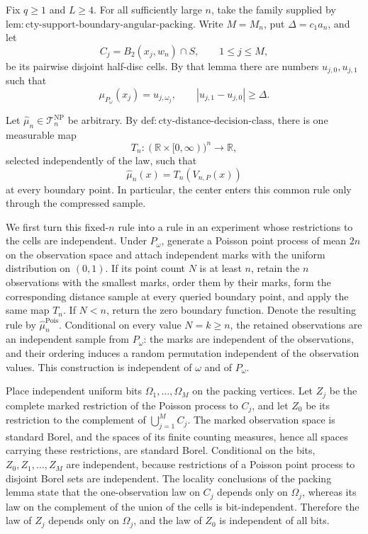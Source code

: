 Fix \(q\geq1\) and \(L\geq4\).  For all sufficiently large \(n\), take the family supplied by \(\mathrm{lem:cty\text{-}support\text{-}boundary\text{-}angular\text{-}packing}\).  Write \(M=M_n\), put \(\Delta=c_1a_n\), and let
\[
 C_j=B_2(x_j,w_n)\cap S,\qquad 1\leq j\leq M,
\]
be its pairwise disjoint half-disc cells.  By that lemma there are numbers \(u_{j,0},u_{j,1}\) such that
\[
 \mu_{P_\omega}(x_j)=u_{j,\omega_j},
 \qquad |u_{j,1}-u_{j,0}|\geq\Delta.
\]

Let \(\widehat\mu_n\in\mathcal T_n^{\mathrm{NP}}\) be arbitrary.  By \(\mathrm{def:cty\text{-}distance\text{-}decision\text{-}class}\), there is one measurable map
\[
 T_n:(\mathbb R\times[0,\infty))^n\longrightarrow\mathbb R,
\]
selected independently of the law, such that
\[
 \widehat\mu_n(x)=T_n(V_{n,P}(x))
\]
at every boundary point.  In particular, the center enters this common rule only through the compressed sample.

We first turn this fixed-\(n\) rule into a rule in an experiment whose restrictions to the cells are independent.  Under \(P_\omega\), generate a Poisson point process of mean \(2n\) on the observation space and attach independent marks with the uniform distribution on \((0,1)\).  If its point count \(N\) is at least \(n\), retain the \(n\) observations with the smallest marks, order them by their marks, form the corresponding distance sample at every queried boundary point, and apply the same map \(T_n\).  If \(N<n\), return the zero boundary function.  Denote the resulting rule by \(\widehat\mu_n^{\mathrm{Pois}}\).  Conditional on every value \(N=k\geq n\), the retained observations are an independent sample from \(P_\omega\): the marks are independent of the observations, and their ordering induces a random permutation independent of the observation values.  This construction is independent of \(\omega\) and of \(P_\omega\).

Place independent uniform bits \(\Omega_1,\ldots,\Omega_M\) on the packing vertices.  Let \(Z_j\) be the complete marked restriction of the Poisson process to \(C_j\), and let \(Z_0\) be its restriction to the complement of \(\bigcup_{j=1}^M C_j\).  The marked observation space is standard Borel, and the spaces of its finite counting measures, hence all spaces carrying these restrictions, are standard Borel.  Conditional on the bits, \(Z_0,Z_1,\ldots,Z_M\) are independent, because restrictions of a Poisson point process to disjoint Borel sets are independent.  The locality conclusions of the packing lemma state that the one-observation law on \(C_j\) depends only on \(\Omega_j\), whereas its law on the complement of the union of the cells is bit-independent.  Therefore the law of \(Z_j\) depends only on \(\Omega_j\), and the law of \(Z_0\) is independent of all bits.

